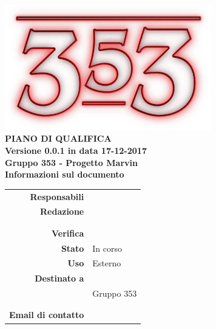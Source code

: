 \documentclass[openany, a4paper, 12pt]{report}
\begin{document}
	
	\begin{titlepage}
		\centering
		\vfill
		{
			\bfseries
			\vskip2cm
			\includegraphics[width=9cm]{../../common/images/logo.png} \\
			\vfill
			\Huge{PIANO DI QUALIFICA}\\
			\vfill
			\Large Versione 0.0.1 in data 17-12-2017\\
			\large Gruppo 353 - Progetto Marvin\\
			\vfill
			\normalsize Informazioni sul documento\\
			\begin{table}[htbp]
				\centering
				\renewcommand\arraystretch{1.2}
				\begin{tabular}{r|l}
					\hline
					\textbf{Responsabili}	& \Parwinder \\
					\textbf{Redazione} 		& \Elena \\
											& \Gianluca \\
											& \Valentina \\
					\textbf{Verifica} 		& \\	
					
					\textbf{Stato} 			& In corso\\
					\textbf{Uso}			& Esterno\\
					\textbf{Destinato a}   	& \Proponente\\
					& Gruppo 353\\
					& \Vardanega\\
					& \Cardin\\
					
					\textbf{Email di contatto}	& \mailleaf
				\end{tabular}
			\end{table}
			\vfill
		}    
	\end{titlepage}
	
	\tableofcontents
	\listoffigures
	\listoftables
	\newpage

	
	
	
	
	
	
	
	
	
	
\end{document}
